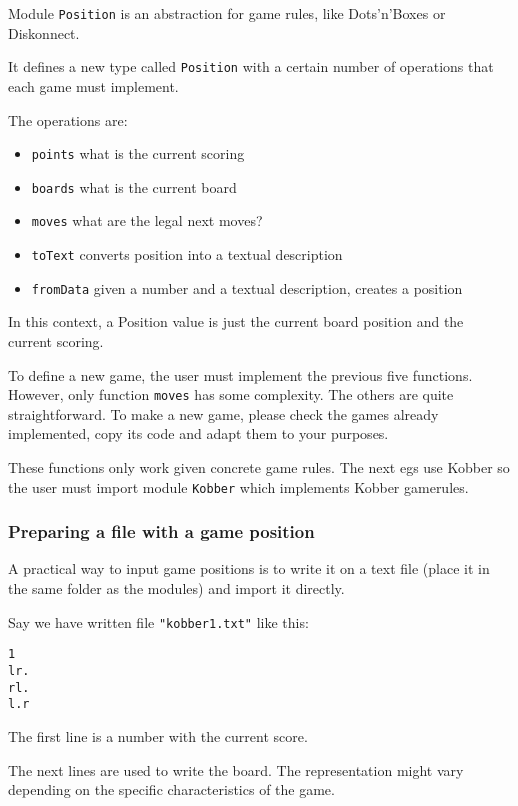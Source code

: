 \documentclass[a4paper,12pt]{article}
\begin{document}
Module \verb|Position| is an abstraction for game rules, like Dots'n'Boxes or Diskonnect.

It defines a new type called \verb|Position| with a certain number of operations 
that each game must implement. 

The operations are:

\begin{itemize} \setlength\itemsep{0.1em}
  \item \verb|points| what is the current scoring
  \item \verb|boards| what is the current board
  \item \verb|moves| what are the legal next moves?
  \item \verb|toText| converts position into a textual description
  \item \verb|fromData| given a number and a textual description, creates a position
\end{itemize}

In this context, a Position value is just the current board position and the current scoring.

To define a new game, the user must implement the previous five functions. However, only function
\verb!moves! has some complexity. The others are quite straightforward. To make a new game, please check the games
already implemented, copy its code and adapt them to your purposes.

These functions only work given concrete game rules. The next egs use Kobber so the user 
must import module \verb!Kobber! which implements Kobber gamerules.

\subsubsection{Preparing a file with a game position}

A practical way to input game positions is to write it on a text file (place it in the same folder
as the modules) and import it directly.

Say we have written file \verb|"kobber1.txt"| like this:

\begin{verbatim}
1
lr.
rl.
l.r
\end{verbatim}

The first line is a number with the current score.

The next lines are used to write the board. The representation might vary depending on the 
specific characteristics of the game.
\end{document}
